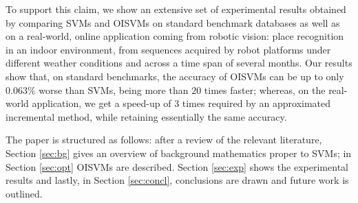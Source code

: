 To support this claim, we show an extensive set of experimental
results obtained by comparing SVMs and OISVMs on standard benchmark
databases as well as on a real-world, online application coming from
robotic vision: place recognition in an indoor environment, from
sequences acquired by robot platforms under different weather
conditions and across a time span of several months. Our results show
that, on standard benchmarks, the accuracy of OISVMs can be up to only
$0.063\%$ worse than SVMs, being more than $20$ times faster;
whereas, on the real-world application,
we get a speed-up of $3$ times required by an approximated
incremental method, while retaining essentially the same accuracy.

The paper is structured as follows: after a review of the relevant
literature, Section \ref{sec:bg} gives an overview of background
mathematics proper to SVMs; in Section \ref{sec:opt} OISVMs are
described.  Section \ref{sec:exp}  shows the experimental results
and lastly, in Section \ref{sec:concl}, conclusions are drawn and future
work is outlined.
